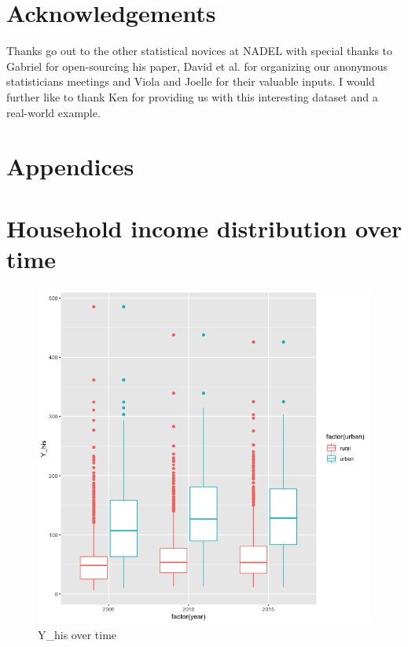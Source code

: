 \documentclass[a4paper, 11pt]{article} %
\begin{document}
\section{Acknowledgements}
Thanks go out to the other statistical novices at NADEL with special thanks to Gabriel for open-sourcing his paper, David et al. for organizing our anonymous statisticians meetings and Viola and Joelle for their valuable inputs. I would further like to thank Ken for providing us with this interesting dataset and a real-world example.


\newpage




\newpage
\section*{Appendices}
\appendix
\section{Household income distribution over time} \label{sec:appendix_household_dist}
\begin{figure}[h!]
    \centering
    \includegraphics[scale=0.5]{figures/income_over_time} 
    \caption{Y\_his over time}
    \label{fig:income_over_time}
\end{figure}
\end{document}
